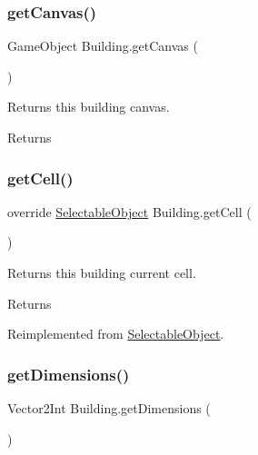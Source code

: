 \subsubsection{\texorpdfstring{get\+Canvas()}{getCanvas()}}
{\footnotesize\ttfamily Game\+Object Building.\+get\+Canvas (\begin{DoxyParamCaption}{ }\end{DoxyParamCaption})}



Returns this building canvas. 

\begin{DoxyReturn}{Returns}

\end{DoxyReturn}
\mbox{\label{class_building_a3e889268dc78194d5a3ae48f73067ff8}} 
\subsubsection{\texorpdfstring{get\+Cell()}{getCell()}}
{\footnotesize\ttfamily override \mbox{\hyperlink{class_selectable_object}{Selectable\+Object}} Building.\+get\+Cell (\begin{DoxyParamCaption}{ }\end{DoxyParamCaption})\hspace{0.3cm}{\ttfamily [virtual]}}



Returns this building current cell. 

\begin{DoxyReturn}{Returns}

\end{DoxyReturn}


Reimplemented from \mbox{\hyperlink{class_selectable_object_a80e0f02ea8465ff2edfbaee1d5451dde}{Selectable\+Object}}.

\mbox{\label{class_building_a79a7914069d3d2886512d22a02c5a328}} 
\subsubsection{\texorpdfstring{get\+Dimensions()}{getDimensions()}}
{\footnotesize\ttfamily Vector2\+Int Building.\+get\+Dimensions (\begin{DoxyParamCaption}{ }\end{DoxyParamCaption})}



